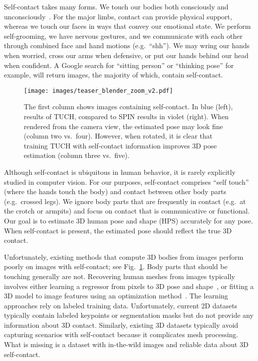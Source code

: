 \documentclass[final]{cvpr}
\theoremstyle{definition}
\begin{document}
Self-contact takes many forms.  We touch our bodies both consciously and unconsciously~\cite{Kwok:2015}. For the major limbs, contact can provide physical support, whereas we touch our faces in ways that convey our emotional state. We perform self-grooming, we have nervous gestures, and we communicate with each other through combined face and hand motions (e.g.~``shh''). We may wring our hands when worried, cross our arms when defensive, or put our hands behind our head when confident.  
A Google search for ``sitting person'' or ``thinking pose'' for example, will return images, the majority of which, contain self-contact.

\begin{figure}
	\centerline{\texttt{[image: images/teaser\_blender\_zoom\_v2.pdf]}}
	\caption{The first column shows images containing self-contact. In blue (left), results of TUCH, compared to  SPIN results in violet (right). 
	When rendered from the camera view, the estimated pose may look fine (column two vs.~four). 
	However, when rotated, it is clear that training TUCH with self-contact information improves 3D pose estimation (column three vs.~five).}
	\label{fig:rotateview}
\end{figure}

Although self-contact is ubiquitous in human behavior, it is rarely explicitly studied in computer vision. 
For our purposes, self-contact comprises ``self touch'' (where the hands touch the body) and contact between other body parts (e.g.~crossed legs). 
We ignore body parts that are frequently in contact (e.g.~at the crotch or armpits) and focus on contact that is communicative or functional. 
Our goal is to estimate 3D human pose and shape (HPS) accurately for 
any pose.
When self-contact is present, the estimated pose should reflect the true 3D contact.

Unfortunately, existing methods that compute 3D bodies from images perform poorly on images with self-contact; see Fig.~\ref{fig:rotateview}.
Body parts that should be touching generally are not.
Recovering human meshes from images typically involves either learning a regressor from pixels to 3D pose and shape~\cite{kanazawa2018end,kolotouros2019learning}, or fitting a 3D model to image features using an optimization method~\cite{Bogo:ECCV:2016,SMPL-X:2019,xiang2019monocular,xiang2020monoclothcap}. 
The learning approaches rely on labeled training data.
Unfortunately, current 2D datasets typically contain labeled keypoints or segmentation masks but do not provide any information about 3D contact.
Similarly,  existing 3D datasets typically avoid capturing scenarios with self-contact because it complicates mesh processing.
What is missing is a dataset with in-the-wild images and reliable data about 3D self-contact.
\end{document}

